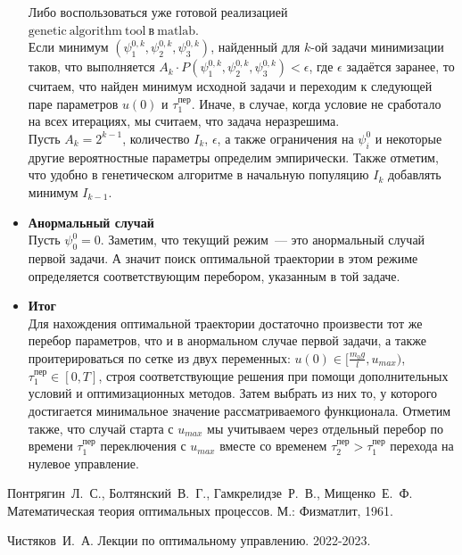 \documentclass[a4paper,12pt]{article}
\begin{document}
\begin{itemize}
\begin{itemize}
\end{itemize}
Либо воспользоваться уже готовой реализацией $\mathrm{genetic \ algorithm \  tool \ \text{в} \ matlab}$. \\
Если минимум $(\psi_1^{0, k}, \psi_2^{0, k}, \psi_3^{0, k})$, найденный для $k$-ой задачи минимизации таков, что выполняется $A_k \cdot P(\psi_1^{0, k}, \psi_2^{0, k}, \psi_3^{0, k}) < \epsilon$, где $\epsilon$ задаётся заранее, то считаем, что найден минимум исходной задачи и переходим к следующей паре параметров $u(0)$ и $\tau_1^{\text{пер}}$. Иначе, в случае, когда условие не сработало на всех итерациях, мы считаем, что задача неразрешима. \\
Пусть $A_k = 2^{k - 1}$, количество $I_k$, $\epsilon$, а также ограничения на $\psi_i^0$ и некоторые другие вероятностные параметры определим эмпирически. Также отметим, что удобно в генетическом алгоритме в начальную популяцию $I_k$ добавлять минимум $I_{k-1}$.

\item \textbf{Анормальный случай} \\
Пусть $\psi_0^0 = 0$. Заметим, что текущий режим~--- это анормальный случай первой задачи. А значит поиск оптимальной траектории в этом режиме определяется соответствующим перебором, указанным в той задаче.

\item \textbf{Итог} \\
Для нахождения оптимальной траектории достаточно произвести тот же перебор параметров, что и
 в анормальном случае первой задачи, а также проитерироваться по сетке из двух переменных: $u(0) \in [\frac{m_0 g}{l}, u_{max})$, $\tau_1^{\text{пер}} \in [0, T]$, строя соответствующие решения при помощи дополнительных условий и оптимизационных методов. Затем выбрать из них то, у которого достигается минимальное значение рассматриваемого функционала. Отметим также, что случай старта с $u_{max}$ мы учитываем через отдельный перебор по времени $\tau_1^{\text{пер}}$  переключения с $u_{max}$ вместе со временем $\tau_2^{\text{пер}} > \tau_1^{\text{пер}} $ перехода на нулевое управление.
\end{itemize}

\newpage
\begin{thebibliography}{99}
\item Понтрягин~Л.~С., Болтянский~В.~Г., Гамкрелидзе~Р.~В., Мищенко~Е.~Ф. Математическая теория оптимальных процессов. М.: Физматлит, 1961.
\item Чистяков~И.~А. Лекции по оптимальному управлению. 2022-2023.


\end{thebibliography}
\end{document}
